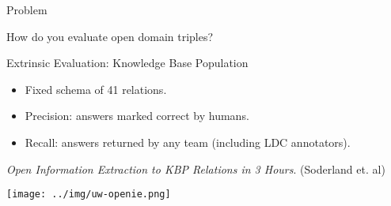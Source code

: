 \begin{frame}{Problem}
\begin{center}
How do you evaluate open domain triples?
\end{center}
\end{frame}

\def\title{Extrinsic Evaluation: Knowledge Base Population}

\begin{frame}[noframenumbering]{\title}
\begin{itemize}
  \item Fixed schema of 41 relations.
  \item Precision: answers marked correct by humans.
  \item Recall: answers returned by any team (including LDC annotators).
\end{itemize}
\pause
\vspace{1em}

 \textit{Open Information Extraction to KBP Relations in 3 Hours}.
  (Soderland et. al)

\begin{center}
\texttt{[image: ../img/uw-openie.png]} \\
\end{center}
\end{frame}

